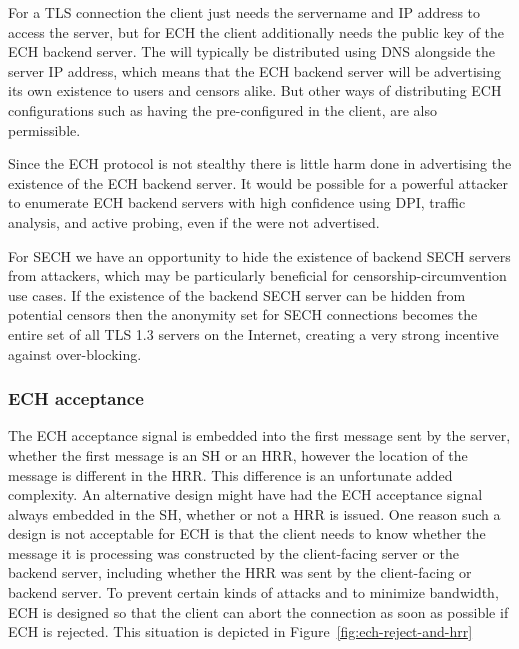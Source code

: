 For a \ac{TLS} connection the client just needs the servername and IP address to access the server,
but for \ac{ECH} the client additionally needs the public key of the \ac{ECH} backend server.
The  will typically be distributed using \ac{DNS} alongside the server \ac{IP} address,
which means that the \ac{ECH} backend server will be advertising its own existence to users and censors alike.
But other ways of distributing \ac{ECH} configurations
such as having the  pre-configured in the client, are also permissible.

Since the \ac{ECH} protocol is not stealthy there is little harm done in advertising the existence of the \ac{ECH} backend server.
It would be possible for a powerful attacker to enumerate \ac{ECH} backend servers with high confidence using \ac{DPI}, traffic analysis, and active probing, even if the 
were not advertised.

For \ac{SECH} we have an opportunity to hide
the existence of backend \ac{SECH} servers from attackers,
which may be particularly beneficial for censorship-circumvention use cases.
If the existence of the backend \ac{SECH} server can be hidden from potential censors then the anonymity set for \ac{SECH} connections becomes the entire set
of all \ac{TLS} 1.3 servers on the Internet,
creating a very strong incentive against over-blocking.



\subsubsection{ECH acceptance}

The \ac{ECH} acceptance signal is embedded into the first message sent by the server,
whether the first message is an \ac{SH} or an \ac{HRR},
however the location of the message is different in the \ac{HRR}.
This difference is an unfortunate added complexity.
An alternative design might have had the \ac{ECH} acceptance signal always embedded in the \ac{SH}, whether or not a \ac{HRR} is issued.
One reason such a design is not acceptable for \ac{ECH}
is that the client needs to know whether the message it is processing was constructed by the client-facing server or the backend server,
including whether the \ac{HRR} was sent by the client-facing or backend server.
To prevent certain kinds of attacks and to minimize bandwidth,
\ac{ECH} is designed so that
the client can abort the connection as soon as possible
if \ac{ECH} is rejected.
This situation is depicted in Figure~\ref{fig:ech-reject-and-hrr}%

